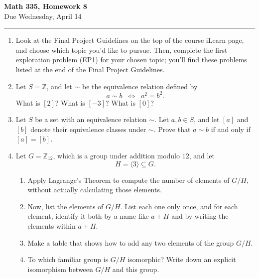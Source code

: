\documentclass[11pt,twoside]{article}
\begin{document}
\begin{center}
{\bf \Large Math 335, Homework 8}\\
\vspace{0.1in}
{\Large Due Wednesday, April 14}
\vspace{0.1cm}
\end{center}

\hrule

\vspace{.2in}

\begin{enumerate}

 
 \item Look at the Final Project Guidelines on the top of the course iLearn page, and choose which topic you'd like to pursue.  Then, complete the first exploration problem (EP1) for your chosen topic; you'll find these problems listed at the end of the Final Project Guidelines.
 
 \vspace{0.5cm}


\item Let $S = \mathbb{Z}$, and let $\sim$ be the equivalence relation defined by
\[a \sim b \;\; \Leftrightarrow \;\; a^2 = b^2.\]
What is $[2]$?  What is $[-3]$?  What is $[0]$?

\vspace{0.5cm}

\item Let $S$ be a set with an equivalence relation $\sim$.  Let $a,b \in S$, and let $[a]$ and $[b]$ denote their equivalence classes under $\sim$.  Prove that $a \sim b$ if and only if $[a] = [b]$.

\vspace{0.5cm}

\item Let $G=\mathbb{Z}_{12}$, which is a group under addition modulo $12$, and let
\[H = \langle 3 \rangle \subseteq G.\]

\begin{enumerate}

\item Apply Lagrange's Theorem to compute the number of elements of $G/H$, without actually calculating those elements.

\vspace{0.25cm}

\item Now, list the elements of $G/H$.  List each one only once, and for each element, identify it both by a name like $a+H$ and by writing the elements within $a+H$.

\vspace{0.25cm}

\item Make a table that shows how to add any two elements of the group $G/H$.

\vspace{0.25cm}

\item To which familiar group is $G/H$ isomorphic?  Write down an explicit isomorphism between $G/H$ and this group.
 
 \vspace{0.25cm}

\end{enumerate}
  \end{enumerate}
\end{document}
